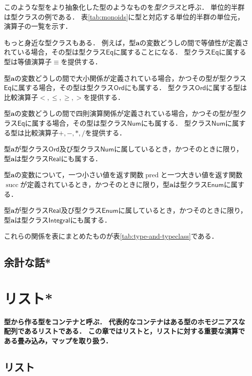 \documentclass[twocolumn]{jsbook}
\newcommand{\hsklType}[1]{\textbf{#1}}
\newcommand{\hsklTypeclass}[1]{\mathsf{#1}}
\DeclareMathOperator{\hsklPred}{pred}
\DeclareMathOperator{\hsklSucc}{succ}
\newcommand{\hsklEnum}{\hsklTypeclass{Enum}}
\newcommand{\hsklIntegral}{\hsklTypeclass{Integral}}
\newcommand{\hsklEq}{\hsklTypeclass{Eq}}
\newcommand{\hsklNum}{\hsklTypeclass{Num}}
\newcommand{\hsklOrd}{\hsklTypeclass{Ord}}
\newcommand{\hsklReal}{\hsklTypeclass{Real}}
\newcommand{\keyword}[1]{\emph{#1}}
\newenvironment{leader}{\begingroup\bf}{\endgroup}
\begin{document}
このような型をより抽象化した型のようなものを\keyword{型クラス}と呼ぶ．
単位的半群は型クラスの例である．
表\ref{tab:monoids}に型と対応する単位的半群の単位元，演算子の一覧を示す．

もっと身近な型クラスもある．
例えば，型$\hsklType{a}$の変数どうしの間で等値性が定義されている場合，その型は型クラス$\hsklEq$に属することになる．
型クラス$\hsklEq$に属する型は等値演算子$\equiv$を提供する．

型$\hsklType{a}$の変数どうしの間で大小関係が定義されている場合，かつその型が型クラス$\hsklEq$に属する場合，その型は型クラス$\hsklOrd$にも属する．
型クラス$\hsklOrd$に属する型は比較演算子$<,\le,\ge,>$を提供する．

型$\hsklType{a}$の変数どうしの間で四則演算関係が定義されている場合，かつその型が型クラス$\hsklEq$に属する場合，その型は型クラス$\hsklNum$にも属する．
型クラス$\hsklNum$に属する型は比較演算子$+,-,*,/$を提供する．

型$\hsklType{a}$が型クラス$\hsklOrd$及び型クラス$\hsklNum$に属しているとき，かつそのときに限り，型$\hsklType{a}$は型クラス$\hsklReal$にも属する．

型$\hsklType{a}$の変数について，一つ小さい値を返す関数$\hsklPred$と一つ大きい値を返す関数$\hsklSucc$が定義されているとき，かつそのときに限り，型$\hsklType{a}$は型クラス$\hsklEnum$に属する．

型$\hsklType{a}$が型クラス$\hsklReal$及び型クラス$\hsklEnum$に属しているとき，かつそのときに限り，型$\hsklType{a}$は型クラス$\hsklIntegral$にも属する．

これらの関係を表にまとめたものが表\ref{tab:type-and-typeclass}である．



\section*{余計な話*}

\chapter{リスト*}

\begin{leader}
型から作る型をコンテナと呼ぶ．
代表的なコンテナはある型のホモジニアスな配列であるリストである．
この章ではリストと，リストに対する重要な演算である畳み込み，マップを取り扱う．
\end{leader}

\section{リスト}
\end{document}
